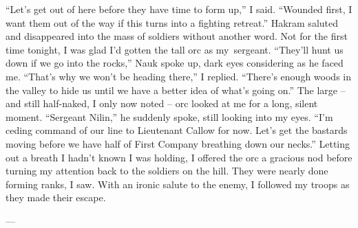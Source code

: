 \documentclass[12pt, openany]{book}
\begin{document}
“Let’s get out of here before they have time to form up,” I said. “Wounded first, I want them out of the way if this turns into a fighting retreat.”
Hakram saluted and disappeared into the mass of soldiers without another word. Not for the first time tonight, I was glad I’d gotten the tall orc as my sergeant.
“They’ll hunt us down if we go into the rocks,” Nauk spoke up, dark eyes considering as he faced me.
“That’s why we won’t be heading there,” I replied. “There’s enough woods in the valley to hide us until we have a better idea of what’s going on.”
The large – and still half-naked, I only now noted – orc looked at me for a long, silent moment.
“Sergeant Nilin,” he suddenly spoke, still looking into my eyes. “I’m ceding command of our line to Lieutenant Callow for now. Let’s get the bastards moving before we have half of First Company breathing down our necks.”
Letting out a breath I hadn’t known I was holding, I offered the orc a gracious nod before turning my attention back to the soldiers on the hill. They were nearly done forming ranks, I saw. With an ironic salute to the enemy, I followed my troops as they made their escape.

—
\end{document}
